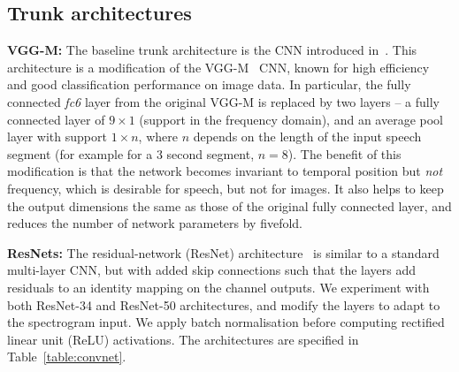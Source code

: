 \documentclass[a4paper]{article}
\def\newpara{\vspace{2pt}}
\def\subsec{\vspace{-5pt}}
\begin{document}
\subsection{Trunk architectures}
\subsec

\newpara\noindent\textbf{VGG-M:}  The baseline trunk architecture is the CNN introduced
in~\cite{Nagrani17}. This architecture is a modification of
the VGG-M~\cite{Chatfield14} CNN, known for high efficiency and good
classification performance on image data.
In particular, 
the fully connected {\em fc6} layer from the original VGG-M is replaced by two layers -- a fully connected layer of $9 \times 1$ (support in the frequency domain), and an average pool layer with support $1 \times n$, where $n$ depends on the length of the input speech segment
(for example for a 3 second segment, $n=8$). 
The benefit of this modification is that the network becomes invariant
to temporal position but \textit{not} frequency, which is desirable for speech, but not for images. It also helps to keep the output dimensions the same as those of the original fully connected layer, and reduces the number of network parameters by fivefold.

\newpara\noindent\textbf{ResNets:} 
The residual-network (ResNet) architecture~\cite{He15}  is similar to a standard
multi-layer CNN, but with added skip connections such that the layers add residuals to
an identity mapping on the channel outputs.
We experiment with both
ResNet-34 and ResNet-50 architectures, 
and modify the layers to adapt to the
spectrogram input. We apply batch normalisation before computing
rectified linear unit (ReLU) activations.  
The architectures are specified in Table~\ref{table:convnet}.
\end{document}
